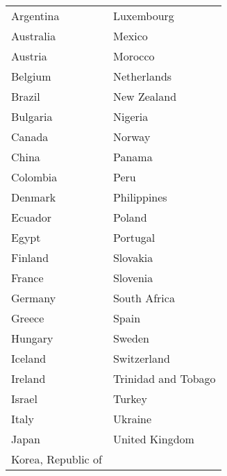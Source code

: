 {\tiny
\begin{tabular}{ll}
  \hline
  \hline
Argentina & Luxembourg \\ 
  Australia & Mexico \\ 
  Austria & Morocco \\ 
  Belgium & Netherlands \\ 
  Brazil & New Zealand \\ 
  Bulgaria & Nigeria \\ 
  Canada & Norway \\ 
  China & Panama \\ 
  Colombia & Peru \\ 
  Denmark & Philippines \\ 
  Ecuador & Poland \\ 
  Egypt & Portugal \\ 
  Finland & Slovakia \\ 
  France & Slovenia \\ 
  Germany & South Africa \\ 
  Greece & Spain \\ 
  Hungary & Sweden \\ 
  Iceland & Switzerland \\ 
  Ireland & Trinidad and Tobago \\ 
  Israel & Turkey \\ 
  Italy & Ukraine \\ 
  Japan & United Kingdom \\ 
  Korea, Republic of &  \\ 
   \hline
\end{tabular}
}
